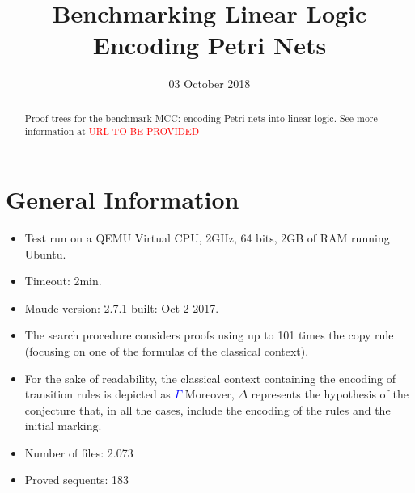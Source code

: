 \documentclass{article}
\title{Benchmarking Linear Logic\\ Encoding Petri Nets}
\date{03 October 2018}
\newcommand\red[1]{\textcolor{red}{#1}}
\newcommand\blue[2]{\textcolor{blue}{#1}}
\begin{document}
\maketitle
\begin{abstract}
Proof trees for the benchmark MCC: encoding Petri-nets into linear logic. See more information at
\red{{URL TO BE PROVIDED}}
\end{abstract}

\section{General Information}
\begin{itemize}
 \item Test run on a QEMU Virtual CPU, 2GHz, 64 bits, 2GB of RAM running Ubuntu. 
\item Timeout: 2min. 
\item Maude version: 2.7.1 built: Oct 2 2017.
\item The search procedure considers proofs  using up to 101 times the copy rule (focusing on one of the formulas of the classical context).
\item For the sake of readability, the classical context containing the encoding of transition rules is depicted as \blue{$\Gamma$} . Moreover, $\Delta$ represents the hypothesis of the conjecture that, in all the cases, include the encoding of the rules and the initial marking. 
\item Number of files: 2.073
\item Proved sequents: 183 

\end{itemize}
\end{document}
